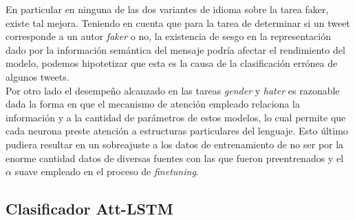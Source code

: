 	En particular en ninguna de las dos variantes de idioma sobre la tarea faker, existe tal mejora. Teniendo en cuenta que para la tarea de determinar si un tweet corresponde a un autor \textit{faker} o no, la existencia de sesgo en la representación dado por la información semántica del mensaje podría afectar el rendimiento del modelo, podemos hipotetizar que esta es la causa de la clasificación errónea de algunos tweets. \\
	Por otro lado el desempeño alcanzado en las tareas \textit{gender} y \textit{hater} es razonable dada la forma en que el mecanismo de atención empleado relaciona la información y a la cantidad de parámetros de estos modelos, lo cual permite que cada neurona  preste atención a estructuras particulares del lenguaje. Esto último pudiera resultar en un sobreajuste a los datos de entrenamiento de no ser por la enorme cantidad datos de diversas fuentes con las que fueron preentrenados y el $\alpha$ suave empleado en el proceso de \textit{finetuning}. 
	
	
	\subsection{Clasificador Att-LSTM}